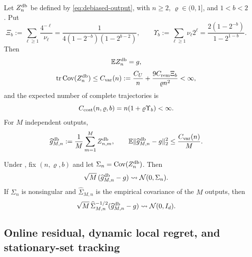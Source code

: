 \begin{theorem}\label{thm:estimator}
Let $Z_n^{\mathrm{db}}$ be defined by \eqref{eq:debiased-output}, with $n\ge2$, $\varrho\in(0,1]$, and $1<b<2$.  Put
\begin{equation}\label{eq:level-series-constants}
 \Xi_b
 :=\sum_{\ell\ge1}\frac{4^{-\ell}}{\nu_\ell}
 =\frac{1}{4(1-2^{-b})(1-2^{b-2})},
 \qquad
 \Upsilon_b
 :=\sum_{\ell\ge1}\nu_\ell2^\ell
 =\frac{2(1-2^{-b})}{1-2^{1-b}}.
\end{equation}
Then
\begin{equation}\label{eq:estimator-unbiased}
 \mathbb E Z_n^{\mathrm{db}}=g,
\end{equation}
\begin{equation}\label{eq:single-output-variance}
 \operatorname{tr}\operatorname{Cov}(Z_n^{\mathrm{db}})
 \le C_{\rm var}(n)
 :=\frac{C_U}{n}+\frac{9C_{\rm rem}\Xi_b}{\varrho n^2}<\infty,
\end{equation}
and the expected number of complete trajectories is
\begin{equation}\label{eq:expected-estimator-cost}
 C_{\rm cost}(n,\varrho,b)
 =n(1+\varrho\Upsilon_b)<\infty.
\end{equation}
For $M$ independent outputs,
\begin{equation}\label{eq:estimator-mse}
 \widehat g_{M,n}^{\mathrm{db}}:=\frac1M\sum_{m=1}^{M}Z_{n,m}^{\mathrm{db}},
 \qquad
 \mathbb E\lVert\widehat g_{M,n}^{\mathrm{db}}-g\rVert_2^2
 \le\frac{C_{\rm var}(n)}{M}.
\end{equation}
\end{theorem}

\begin{theorem}\label{thm:clt}
Under , fix $(n,\varrho,b)$ and let $\Sigma_n=\operatorname{Cov}(Z_n^{\mathrm{db}})$.  Then
\begin{equation}\label{eq:clt}
 \sqrt M\,(\widehat g_{M,n}^{\mathrm{db}}-g)
 \rightsquigarrow \mathcal N(0,\Sigma_n).
\end{equation}
If $\Sigma_n$ is nonsingular and $\widehat\Sigma_{M,n}$ is the empirical covariance of the $M$ outputs, then
\begin{equation}\label{eq:studentized-clt}
 \sqrt M\,\widehat\Sigma_{M,n}^{-1/2}
 (\widehat g_{M,n}^{\mathrm{db}}-g)
 \rightsquigarrow \mathcal N(0,I_d).
\end{equation}
\end{theorem}

\subsection{Online residual, dynamic local regret, and stationary-set tracking}

